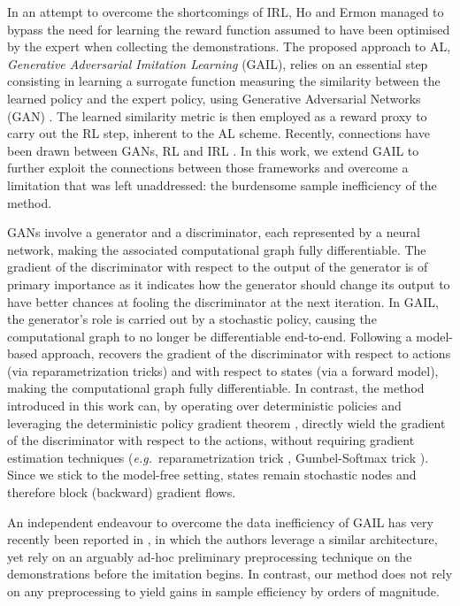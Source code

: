 In an attempt to overcome the shortcomings of IRL, Ho and Ermon
\cite{Ho2016-bv} managed to bypass the need for learning the reward function
assumed to have been optimised by the expert when collecting the
demonstrations.
The proposed approach to AL,
\textit{Generative Adversarial Imitation Learning} (GAIL),
relies on an essential step consisting in learning
a surrogate function measuring the similarity between the learned policy and
the expert policy, using Generative Adversarial Networks (GAN)
\cite{Goodfellow2014-yk}.
The learned similarity metric is then employed as a reward proxy to carry out
the RL step, inherent to the AL scheme.
Recently, connections have been drawn between GANs, RL \cite{Pfau2016-ft} and
IRL \cite{Finn2016-uj}.
In this work, we extend GAIL to further exploit the connections between those
frameworks and overcome a limitation that was left unaddressed: the
burdensome sample inefficiency of the method.

GANs
involve a generator and a discriminator, each represented by a neural network,
making the associated computational graph fully differentiable.
The gradient of the discriminator with respect to the output of
the generator is of primary importance as it indicates how the
generator should change its output to have better chances at fooling the
discriminator at the next iteration.
In GAIL, the generator's role is carried out by a stochastic policy, causing
the computational graph to no longer be differentiable end-to-end.
Following a model-based approach, \cite{Baram2017-es} recovers the
gradient of the discriminator with respect to actions
(via reparametrization tricks)
and with respect to states (via a forward model),
making the computational graph fully differentiable.
In contrast, the method introduced in this work can,
by operating over deterministic policies and leveraging
the deterministic policy gradient theorem \cite{Silver2014-dk},
directly wield the gradient of the discriminator
with respect to the actions,
without requiring gradient estimation techniques
(\textit{e.g.}~reparametrization trick \cite{Kingma2014-hf},
Gumbel-Softmax trick \cite{Jang2017-tu, Maddison2017-gk}).
Since we stick to the model-free setting,
states remain stochastic nodes and therefore block (backward) gradient flows.

An independent endeavour to overcome the data inefficiency of GAIL has
very recently
been reported in \cite{Kostrikov2019-jo},
in which the authors leverage a similar architecture,
yet rely on an arguably ad-hoc preliminary preprocessing technique on
the demonstrations before the imitation begins.
In contrast, our method does not rely on any preprocessing to
yield gains in sample efficiency by orders of magnitude.

